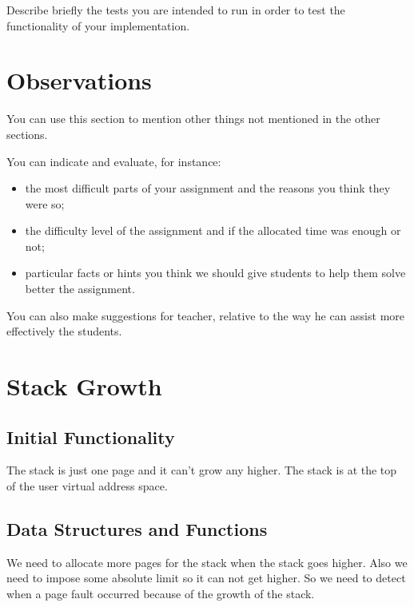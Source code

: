 Describe briefly the tests you are intended to run in order to test the functionality of your implementation.

\section{Observations}

You can use this section to mention other things not mentioned in the other sections. 

You can indicate and evaluate, for instance:
\begin{itemize}
	\item the most difficult parts of your assignment and the reasons you think they were so; 
	
	\item the difficulty level of the assignment and if the allocated time was enough or not; 

	\item particular facts or hints you think we should give students to help them solve better the assignment.

\end{itemize}

You can also make suggestions for teacher, relative to the way he can assist more effectively the students.

\section{Stack Growth}
\subsection{Initial Functionality}

The stack is just one page and it can't grow any higher. The stack is at the top of the user
virtual address space.

\subsection{Data Structures and Functions}

We need to allocate more pages for the stack when the stack goes higher. Also we need to
impose some absolute limit so it can not get higher. So we need to detect when a page fault occurred because of the growth of the stack. 

